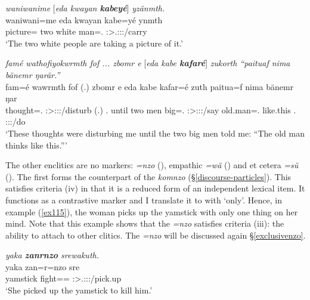 \begin{exe}
	\ex \emph{waniwanime} [\emph{eda kwayan \textbf{kabeyé}}] \emph{yzänmth.}\\
	\gll waniwani=me eda kwayan {kabe=yé} ynmth\\
	picture=\Ins{} two white man=\Erg.\Nsg{} \Stdu:\Sbj>\Tsg.\Masc:\Obj:\Nonpast:\Ipfv/carry\\
	\trans `The two white people are taking a picture of it.'
	\label{ex498}
\end{exe}
\begin{exe}
	\ex \emph{famé wathofiyokwrmth fof ... zbomr e} [\emph{eda kabe \textbf{kafaré}}]\emph{ zukorth ``paituaf nima bänemr ŋarär.''}\\
	\gll fam=é wawrmth fof (.) zbomr e eda kabe kafar=é zuth paitua=f nima bänemr ŋar\\
	thought=\Erg.\Nsg{} \Stpl:\Sbj>\Fsg:\Obj:\Rpst:\Dur/disturb \Emph{} (.) \Prox.\Purp{} until two men big=\Erg.\Nsg{} \Stdu:\Sbj>\Fsg:\Obj:\Rpst:\Pfv/say {old.man=\Erg.\Sg} {like.this} \Med.\Purp{} \Stsg:\Sbj:\Nonpast:\Ipfv/do\\
	\trans `These thoughts were disturbing me until the two big men told me: ``The old man thinks like this.'''
	\label{ex499}
\end{exe}

The other  enclitics are no  markers:  \emph{=nzo} (\Only), empathic \emph{=wä} (\Emph) and et cetera \emph{=sü} (\Etc). The first forms the  counterpart of the  \emph{komnzo} (\S{}\ref{discourse-particles}). This  satisfies criteria (iv) in that it is a reduced form of an independent lexical item. It functions as a contrastive  marker and I translate it to with  `only'. Hence, in example (\ref{ex115}), the woman picks up the yamstick with only one thing on her mind. Note that this example shows that the  \emph{=nzo} satisfies criteria (iii): the ability to attach to other clitics. The   \emph{=nzo} will be discussed again \S{}\ref{exclusivenzo}.

\begin{exe}
	\ex \emph{yaka \textbf{zanrnzo} srewakuth.}\\
	\gll yaka zan=r=nzo sre\\
	yamstick fight=\Purp{}=\Only{} \Stsg:\Sbj>\Tsg.\Masc:\Obj:\Irr:\Pfv/pick.up\\
	\trans `She picked up the yamstick to kill him.'
	\label{ex115}
\end{exe}

